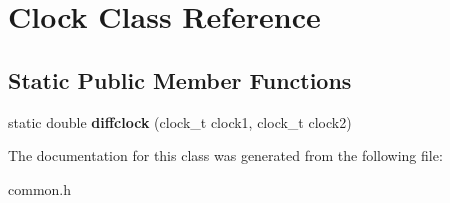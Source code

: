 \hypertarget{class_clock}{
\section{Clock Class Reference}
\label{class_clock}
}
\subsection*{Static Public Member Functions}
\begin{DoxyCompactItemize}
\item 
\hypertarget{class_clock_af45b8db844300755b8c4244a65f60833}{
static double {\bfseries diffclock} (clock\_\-t clock1, clock\_\-t clock2)}
\label{class_clock_af45b8db844300755b8c4244a65f60833}

\end{DoxyCompactItemize}


The documentation for this class was generated from the following file:\begin{DoxyCompactItemize}
\item 
common.h\end{DoxyCompactItemize}
